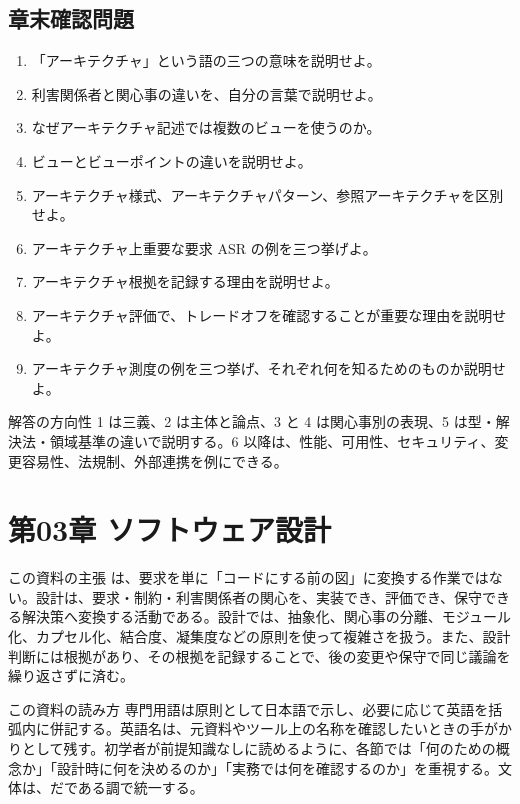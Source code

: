 \documentclass[a4paper,11pt]{ltjsarticle}
\numberwithin{figure}{section}
\numberwithin{table}{section}
\begin{document}
\subsection{章末確認問題}
\begin{enumerate}
  \item 「アーキテクチャ」という語の三つの意味を説明せよ。
  \item 利害関係者と関心事の違いを、自分の言葉で説明せよ。
  \item なぜアーキテクチャ記述では複数のビューを使うのか。
  \item ビューとビューポイントの違いを説明せよ。
  \item アーキテクチャ様式、アーキテクチャパターン、参照アーキテクチャを区別せよ。
  \item アーキテクチャ上重要な要求 ASR の例を三つ挙げよ。
  \item アーキテクチャ根拠を記録する理由を説明せよ。
  \item アーキテクチャ評価で、トレードオフを確認することが重要な理由を説明せよ。
  \item アーキテクチャ測度の例を三つ挙げ、それぞれ何を知るためのものか説明せよ。
\end{enumerate}

\begin{statementbox}{解答の方向性}
1 は三義、2 は主体と論点、3 と 4 は関心事別の表現、5 は型・解決法・領域基準の違いで説明する。6 以降は、性能、可用性、セキュリティ、変更容易性、法規制、外部連携を例にできる。
\end{statementbox}

\section{第03章 ソフトウェア設計}
\begin{pointbox}{この資料の主張}
  は、要求を単に「コードにする前の図」に変換する作業ではない。設計は、要求・制約・利害関係者の関心を、実装でき、評価でき、保守できる解決策へ変換する活動である。設計では、抽象化、関心事の分離、モジュール化、カプセル化、結合度、凝集度などの原則を使って複雑さを扱う。また、設計判断には根拠があり、その根拠を記録することで、後の変更や保守で同じ議論を繰り返さずに済む。
  \end{pointbox}

\begin{pointbox}{この資料の読み方}
  専門用語は原則として日本語で示し、必要に応じて英語を括弧内に併記する。英語名は、元資料やツール上の名称を確認したいときの手がかりとして残す。初学者が前提知識なしに読めるように、各節では「何のための概念か」「設計時に何を決めるのか」「実務では何を確認するのか」を重視する。文体は、だである調で統一する。
  \end{pointbox}
\end{document}
